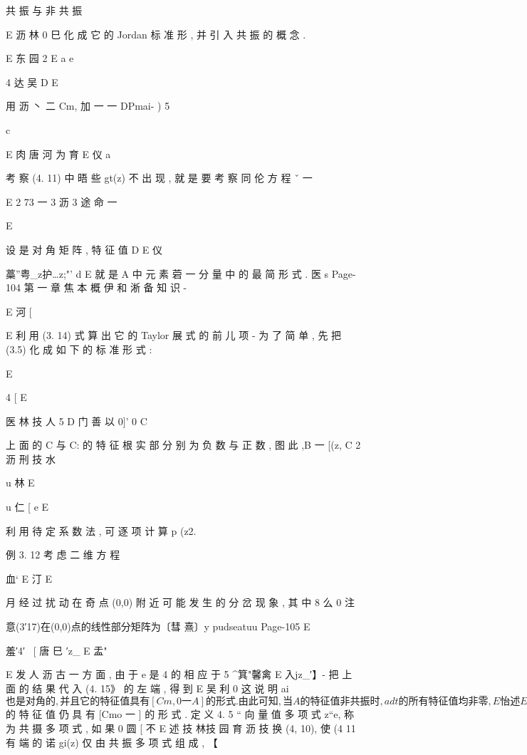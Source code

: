 {{共 振 与 非 共 振

E 沥 林
0
巳 化 成 它 的 Jordan 标 准 形 , 并 引 入 共 振 的 概 念 .

E 东 园 2
E a e

4 达
吴 D
E

用 沥
丶 二 Cm, 加 一 一 DPmai- )
5

c

E 肉 唐 河 为 育
E 仪 a

考 察 (4. 11) 中 晤 些 gt(z) 不 出 现 , 就 是 要 考 察 同 伦 方 程 ˇ 一

E 2 73 一 3 沥 3 途 命 一

E

设 是 对 角 矩 阵 , 特 征 值 %
D
E 仪

藁”粤_z护…z;"' d E
就 是 A 中 元 素 菪 一 分 量 中 的 最 简 形 式 .
医
s
Page-104
第 一 章 焦 本 概 伊 和 淅 备 知 识 -

E 河 [

E
利 用 (3. 14) 式 算 出 它 的 Taylor 展 式 的 前 儿 项 -
为 了 简 单 , 先 把 (3.5) 化 成 如 下 的 标 准 形 式 :

E

4 [
E

医 林 技 人 5
D
门 善 以 0]'
0 C

上 面 的 C 与 C: 的 特 征 根 实 部 分 别 为 负 数 与 正 数 , 图 此 ,B 一 [(z,
C 2 沥
刑 技 水

u 林
E

u 仁
[
e
E

利 用 待 定 系 数 法 , 可 逐 项 计 算 p (z2.

例 3. 12 考 虑 二 维 方 程

血`
E 汀
E

月
经 过 扰 动 在 奇 点 (0,0) 附 近 可 能 发 生 的 分 岔 现 象 , 其 中 8 么 0 注

意(3′17)在(0,0)点的线性部分矩阵为〔彗 熹〕y pudseatuu
Page-105
E

羞′4′~ [ 唐 巳 ′z_ E 盂"

E 发 人 沥
古 一 方 面 , 由 于 e 是 4 的 相 应 于 %
5 ^箕"馨禽 E 入jz_′】-
把 上 面 的 结 果 代 入 (4. 15》 的 左 端 , 得 到
E 吴 利 0
这 说 明 ai$ 也 是 对 角 的 , 并 且 它 的 特 征 值 具 有 [Cm,0 一 A] 的 形
式 . 由 此 可 知 , 当 A 的 特 征 值 非 共 振 时 ,adt 的 所 有 特 征 值 均 非 零 ,
E 怡 述
E a
ad 也 有 相 应 的 Jordan 坡 , 并 且 ad$ 的 特 征 值 仍 具 有 [Cmo 一 ]
的 形 式 .
定 义 4. 5 “ 向 量 值 多 项 式 z“e, 称 为 共 摄 多 项 式 , 如 果
0 圆 [ 不
E 述
技
林技 园 育 沥 技
换 (4, 10), 使 (4 11 有 端 的 诺 gi(z) 仅 由 共 振 多 项 式 组 成 , 【

}}
